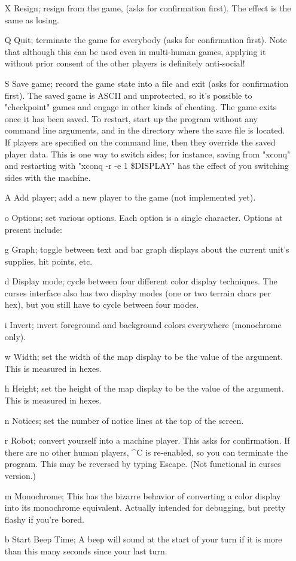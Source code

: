 \begin{itemize}
\item[{X}]
Resign; resign from the game, (asks for confirmation first).
The effect is the same as losing.
\item[{Q}]
Quit; terminate the game for everybody (asks for confirmation first).
Note that although this can be used even in multi-human games, applying it
without prior consent of the other players is definitely anti-social!
\item[{S}]
Save game; record the game state into a file and exit
(asks for confirmation first).
The saved game is ASCII and unprotected,
so it's possible to "checkpoint" games and engage in other kinds of cheating.
The game exits once it has been saved.  To restart, start up the program
without any command line arguments, and in the directory where the save
file is located.  If players are specified on the command line, then they
override the saved player data.  This is one way to switch sides; for instance,
saving from "xconq" and restarting with "xconq -r -e 1 \$DISPLAY" has the
effect of you switching sides with the machine.
\item[{A}]
Add player; add a new player to the game (not implemented yet).
\item[{o}]
Options; set various options.  Each option is a single character.
Options at present include:
\item[{g}]
Graph; toggle between text and bar graph displays about the current unit's
supplies, hit points, etc.
\item[{d}]
Display mode; cycle between four different color display techniques.
The curses interface also has two display modes (one or two terrain chars
per hex), but you still have to cycle between four modes.
\item[{i}]
Invert; invert foreground and background colors everywhere (monochrome
only).
\item[{w}]
Width;  set the width of the map display to be the value of the argument.
This is measured in hexes.
\item[{h}]
Height;  set the height of the map display to be the value of the argument.
This is measured in hexes.
\item[{n}]
Notices;  set the number of notice lines at the top of the screen.
\item[{r}]
Robot; convert yourself into a machine player.  This asks for confirmation.
If there are no other human players,
\^{}C is re-enabled, so you can terminate the program.  This may be
reversed by typing Escape. (Not functional in curses version.)
\item[{m}]
Monochrome; This has the bizarre behavior
of converting a color display into its monochrome equivalent.
Actually intended for debugging, but pretty flashy if you're bored.
\item[{b}]
Start Beep Time; A beep will sound at the start of your turn if it is
more than this many seconds since your last turn.
\end{itemize}\par\noindent
